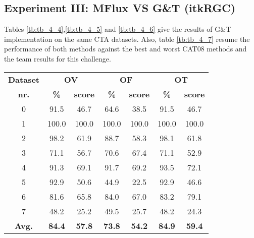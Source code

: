 \subsection{Experiment III: MFlux VS G\&T (itkRGC)}

Tables \ref{tb:tb_4_4},\ref{tb:tb_4_5} and \ref{tb:tb_4_6} give the results of G\&T implementation on the same CTA datasets. Also, table \ref{tb:tb_4_7} resume the performance of both methods against the best and worst CAT08 methods and the team results for this challenge.

\begin{table*}[h]
\scriptsize
\caption{G\&T average overlap per dataset}
\centering
\begin{tabular}{|c|cc|cc|cc|}
\hline
\multicolumn{1}{|c|}{\textbf{Dataset}} &\multicolumn{2}{c|}{\textbf{OV}} &\multicolumn{2}{c|}{\textbf{OF}} &\multicolumn{2}{c|}{\textbf{OT}}\\
\multicolumn{1}{|c|}{\textbf{nr.}} &\multicolumn{1}{c|}{\textbf{\%}} &\multicolumn{1}{c|}{\textbf{score}} &\multicolumn{1}{c|}{\textbf{\%}} &\multicolumn{1}{c|}{\textbf{score}} &\multicolumn{1}{c|}{\textbf{\%}} &\multicolumn{1}{c|}{\textbf{score}}\\
\hline
0&91.5&46.7&64.6&38.5&91.5&46.7\\
1&100.0&100.0&100.0&100.0&100.0&100.0\\
2&98.2&61.9&88.7&58.3&98.1&61.8\\
3&71.1&56.7&70.6&67.4&71.1&52.9\\
4&91.3&69.1&91.7&69.2&93.5&72.1\\
5&92.9&50.6&44.9&22.5&92.9&46.6\\
6&81.6&65.8&84.0&67.0&83.2&79.1\\
7&48.2&25.2&49.5&25.7&48.2&24.3\\
\hline
\textbf{Avg.}&\textbf{84.4}&\textbf{57.8}&\textbf{73.8}&\textbf{54.2}&\textbf{84.9}&\textbf{59.4}\\
\hline
\end{tabular}
\vspace{-0.3cm}
\label{tb:tb_4_4}
\normalsize
\end{table*}

